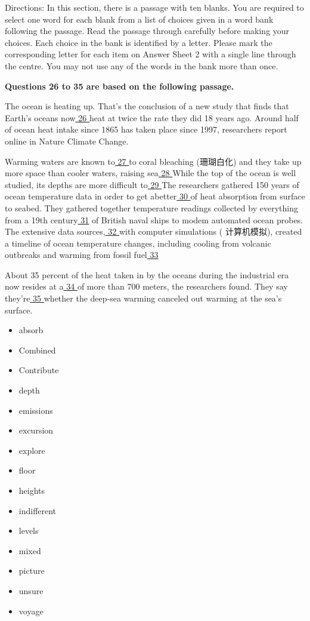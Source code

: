 \documentclass[UTF8,11pt]{ctexart}
\begin{document}
Directions: In this section, there is a passage with ten blanks. You are required to select one word for each blank from a list of choices given in a word bank following the passage. Read the passage through carefully before making your choices. Each choice in the bank is identified by a letter. Please mark the corresponding letter for each item on Answer Sheet 2 with a single line through the centre. You may not use any of the words in the bank more than once.


\textbf{Questions 26 to 35 are based on the following passage.}


The ocean is heating up. That's the conclusion of a new study that finds that Earth's oceans now\uline{ 26 }heat at twice the rate they did 18 years ago. Around half of ocean heat intake since 1865 has taken place since 1997, researchers report online in Nature Climate Change.


Warming waters are known to\uline{ 27 }to coral bleaching (珊瑚白化) and they take up more space than cooler waters, raising sea\uline{ 28 }While the top of the ocean is well studied, its depths are more difficult to\uline{ 29 }The researchers gathered 150 years of ocean temperature data in order to get abetter\uline{ 30 }of heat absorption from surface to seabed. They gathered together temperature readings collected by everything from a 19th century\uline{ 31} of British naval ships to modem automated ocean probes. The extensive data sources,\uline{ 32 }with computer simulations ( 计算机模拟), created a timeline of ocean temperature changes, including cooling from volcanic outbreaks and warming from fossil fuel\uline{ 33}


About 35 percent of the heat taken in by the oceans during the industrial era now resides at a\uline{ 34 }of more than 700 meters, the researchers found. They say they're\uline{ 35 }whether the deep-sea warming canceled out warming at the sea's surface.


\begin{itemize}[leftmargin=2em,itemsep=.2em,topsep=.4em]\item[A.] absorb
\item[B.] Combined
\item[C.] Contribute
\item[D.] depth
\item[E.] emissions
\item[F.] excursion
\item[G.] explore
\item[H.] floor
\item[I.] heights
\item[J.] indifferent
\item[K.] levels
\item[L.] mixed
\item[M.] picture
\item[N.] unsure
\item[O.] voyage
\end{itemize}
\end{document}
